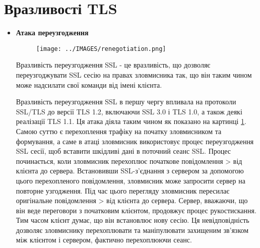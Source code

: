 \section{Вразливості TLS}
\begin{itemize}
\item \textbf{Атака переузгодження}
    \begin{figure}[ht]
        \centering
        \texttt{[image: ../IMAGES/renegotiation.png]}
        \label{regenetiation_attack}
    \end{figure}
    Вразливість переузгодження SSL - це вразливість, що дозволяє переузгоджувати SSL сесію на правах зловмисника так, що він таким чином може надсилати свої команди від імені клієнта.
    
    Вразливість переузгодження SSL в першу чергу впливала на протоколи SSL/TLS до версії TLS 1.2, включаючи SSL 3.0 і TLS 1.0, а також деякі реалізації TLS 1.1.
    Ця атака діяла таким чином як показано на картинці \ref{regenetiation_attack}. Самою суттю є перехоплення трафіку на початку зловмисником та формування, а саме в атаці зловмисник використовує процес переузгодження SSL сесії, щоб вставити шкідливі дані в поточний сеанс SSL. Процес починається, коли зловмисник перехоплює початкове повідомлення > від клієнта до сервера. Встановивши SSL-з'єднання з сервером за допомогою цього перехопленого повідомлення, зловмисник може запросити сервер на повторне узгодження.
    Під час цього перегляду зловмисник пересилає оригінальне повідомлення > від клієнта до сервера. Сервер, вважаючи, що він веде переговори з початковим клієнтом, продовжує процес рукостискання. Тим часом клієнт думає, що він встановлює нову сесію. Ця невідповідність дозволяє зловмиснику перехоплювати та маніпулювати захищеним зв'язком між клієнтом і сервером, фактично перехоплюючи сеанс.
    

\end{itemize}
